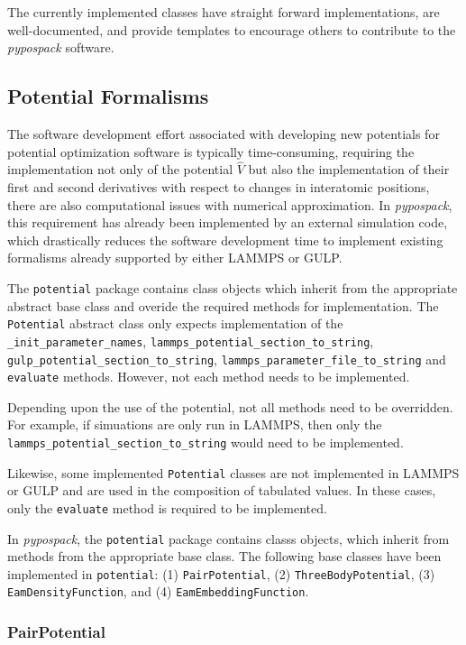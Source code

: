 The currently implemented classes have straight forward implementations, are well-documented, and provide templates to encourage others to contribute to the \emph{pypospack} software.

\subsection{Potential Formalisms}

The software development effort associated with developing new potentials for potential optimization software is typically time-consuming, requiring the implementation not only of the potential $\hat{V}$ but also the implementation of their first and second derivatives with respect to changes in interatomic positions, there are also computational issues with numerical approximation.  In \emph{pypospack}, this requirement has already been implemented by an external simulation code, which drastically reduces the software development time to implement existing formalisms already supported by either LAMMPS or GULP.

The \verb|potential| package contains class objects which inherit from the appropriate abstract base class and overide the required methods for implementation.  The \verb|Potential| abstract class only expects implementation of the \verb|_init_parameter_names|, \verb|lammps_potential_section_to_string|, \verb|gulp_potential_section_to_string|, \verb|lammps_parameter_file_to_string| and \verb|evaluate| methods.  However, not each method needs to be implemented.

Depending upon the use of the potential, not all methods need to be overridden.  For example, if simuations are only run in LAMMPS, then only the \verb|lammps_potential_section_to_string| would need to be implemented.

Likewise, some implemented \verb|Potential| classes are not implemented in LAMMPS or GULP and are used in the composition of tabulated values.  In these cases, only the \verb|evaluate| method is required to be implemented.

In \emph{pypospack}, the \verb|potential| package contains classs objects, which inherit from methods from the appropriate base class.  The following base classes have been implemented in \verb|potential|: (1) \verb|PairPotential|, (2) \verb|ThreeBodyPotential|, (3) \verb|EamDensityFunction|, and (4) \verb|EamEmbeddingFunction|.

\subsubsection{PairPotential}

